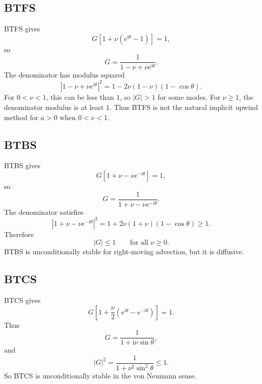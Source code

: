 \documentclass[11pt]{article}
\newcommand{\ii}{\mathrm{i}}
\begin{document}
\subsection{BTFS}

BTFS gives
\begin{equation}
    G\left[1+\nu(e^{\ii\theta}-1)\right]=1,
\end{equation}
so
\begin{equation}
    G=\frac{1}{1-\nu+\nu e^{\ii\theta}}.
\end{equation}
The denominator has modulus squared
\begin{equation}
    |1-\nu+\nu e^{\ii\theta}|^2
    =
    1-2\nu(1-\nu)(1-\cos\theta).
\end{equation}
For $0<\nu<1$, this can be less than $1$, so $|G|>1$ for some modes.  For $\nu\ge1$, the denominator modulus is at least $1$.  Thus BTFS is not the natural implicit upwind method for $a>0$ when $0<\nu<1$.

\subsection{BTBS}

BTBS gives
\begin{equation}
    G\left[1+\nu-\nu e^{-\ii\theta}\right]=1,
\end{equation}
so
\begin{equation}
    G=\frac{1}{1+\nu-\nu e^{-\ii\theta}}.
\end{equation}
The denominator satisfies
\begin{equation}
    |1+\nu-\nu e^{-\ii\theta}|^2
    =
    1+2\nu(1+\nu)(1-\cos\theta)\ge1.
\end{equation}
Therefore
\begin{equation}
    |G|\le1\qquad \text{for all }\nu\ge0.
\end{equation}
BTBS is unconditionally stable for right-moving advection, but it is diffusive.

\subsection{BTCS}

BTCS gives
\begin{equation}
    G\left[1+\frac{\nu}{2}(e^{\ii\theta}-e^{-\ii\theta})\right]=1.
\end{equation}
Thus
\begin{equation}
    G=\frac{1}{1+\ii\nu\sin\theta},
\end{equation}
and
\begin{equation}
    |G|^2=\frac{1}{1+\nu^2\sin^2\theta}\le1.
\end{equation}
So BTCS is unconditionally stable in the von Neumann sense.
\end{document}
